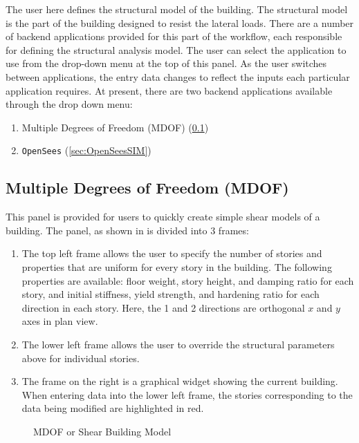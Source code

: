 The user here defines the structural model of the
building. The structural model is the part of the building designed
to resist the lateral loads. There are a number of backend
applications provided for this part of the workflow, each responsible
for defining the structural analysis model. The user can select the application to use from the drop-down menu at the top of this panel. As the user switches between applications,
the entry data changes to reflect the inputs each particular application requires. At present, there are two backend applications
available through the drop down menu: 

\begin{enumerate}
\item Multiple Degrees of Freedom (MDOF) (\ref{sec:MDOF})
\item \texttt{OpenSees} (\ref{sec:OpenSeesSIM})
\end{enumerate}

\subsection{Multiple Degrees of Freedom (MDOF)}\label{sec:MDOF}

This panel is provided for users to quickly create simple shear models
of a building. The panel, as shown in  is divided
into 3 frames:
\begin{enumerate}
\item The top left frame allows the user to specify the number of stories and properties that are uniform for every story in the building. The following properties are available: floor weight, story height, and damping ratio for each story, and initial stiffness, yield strength, and hardening ratio for each direction in each story. Here, the 1 and 2 directions are orthogonal $x$ and $y$ axes in plan view.
\item The lower left frame allows the user to override the structural parameters above for individual stories.
\item The frame on the right is a graphical widget showing the current building. When entering data into the lower left frame, the stories corresponding to the data being modified are highlighted in red.
\end{enumerate}

\begin{figure}[!htbp]
  \caption{MDOF or Shear Building Model}
  \label{fig:mdof}
\end{figure}

